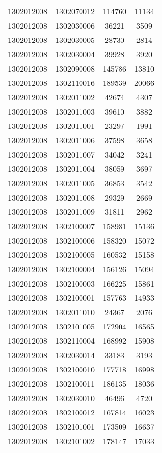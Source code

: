 \begin{longtable}[h]{llcc}
		1302012008 & 1302070012 & 114760 & 11134\\
		1302012008 & 1302030006 & 36221 & 3509\\
		1302012008 & 1302030005 & 28730 & 2814\\
		1302012008 & 1302030004 & 39928 & 3920\\
		1302012008 & 1302090008 & 145786 & 13810\\
		1302012008 & 1302110016 & 189539 & 20066\\
		1302012008 & 1302011002 & 42674 & 4307\\
		1302012008 & 1302011003 & 39610 & 3882\\
		1302012008 & 1302011001 & 23297 & 1991\\
		1302012008 & 1302011006 & 37598 & 3658\\
		1302012008 & 1302011007 & 34042 & 3241\\
		1302012008 & 1302011004 & 38059 & 3697\\
		1302012008 & 1302011005 & 36853 & 3542\\
		1302012008 & 1302011008 & 29329 & 2669\\
		1302012008 & 1302011009 & 31811 & 2962\\
		1302012008 & 1302100007 & 158981 & 15136\\
		1302012008 & 1302100006 & 158320 & 15072\\
		1302012008 & 1302100005 & 160532 & 15158\\
		1302012008 & 1302100004 & 156126 & 15094\\
		1302012008 & 1302100003 & 166225 & 15861\\
		1302012008 & 1302100001 & 157763 & 14933\\
		1302012008 & 1302011010 & 24367 & 2076\\
		1302012008 & 1302101005 & 172904 & 16565\\
		1302012008 & 1302110004 & 168992 & 15908\\
		1302012008 & 1302030014 & 33183 & 3193\\
		1302012008 & 1302100010 & 177718 & 16998\\
		1302012008 & 1302100011 & 186135 & 18036\\
		1302012008 & 1302030010 & 46496 & 4720\\
		1302012008 & 1302100012 & 167814 & 16023\\
		1302012008 & 1302101001 & 173509 & 16637\\
		1302012008 & 1302101002 & 178147 & 17033\\

\end{longtable}
